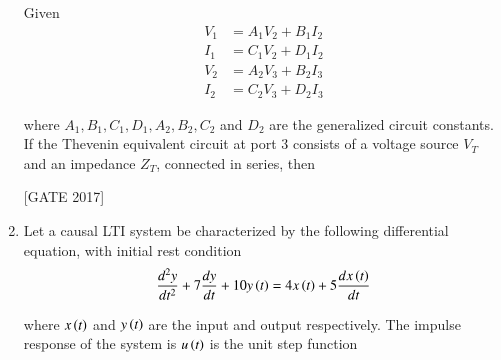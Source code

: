 \documentclass[journal,12pt,onecolumn]{IEEEtran}
\theoremstyle{remark}
\begin{document}
\begin{enumerate}
\begin{center}
  
\end{center}

Given
\begin{align*}
    V_1 &= A_1 V_2 + B_1 I_2\\ I_1 &= C_1 V_2 + D_1 I_2\\
    V_2 &= A_2 V_3 + B_2 I_3 \\ I_2 &= C_2 V_3 + D_2 I_3
\end{align*}
    



where  $A_1, B_1, C_1, D_1, A_2, B_2, C_2$ and $ D_2$ are the generalized circuit constants. If the Thevenin equivalent circuit at port 3 consists of a voltage source  $V_T$ and an impedance $ Z_T$, connected in series, then

\hfill{[GATE 2017]} \begin{enumerate}
\end{enumerate}

\item Let a causal LTI system be characterized by the following differential equation, with initial rest condition
\begin{align*}
   \frac{d^2 y}{dt^2} + 7 \frac{dy}{dt} + 10 y\left(t\right) = 4x\left(t\right) + 5 \frac{dx\left(t\right)}{dt} 
\end{align*}

where $x\left(t\right)$ and  $y\left(t\right)$ are the input and output respectively. The impulse response of the system is $ u\left(t\right)$ is the unit step function


\end{enumerate}
\end{document}
